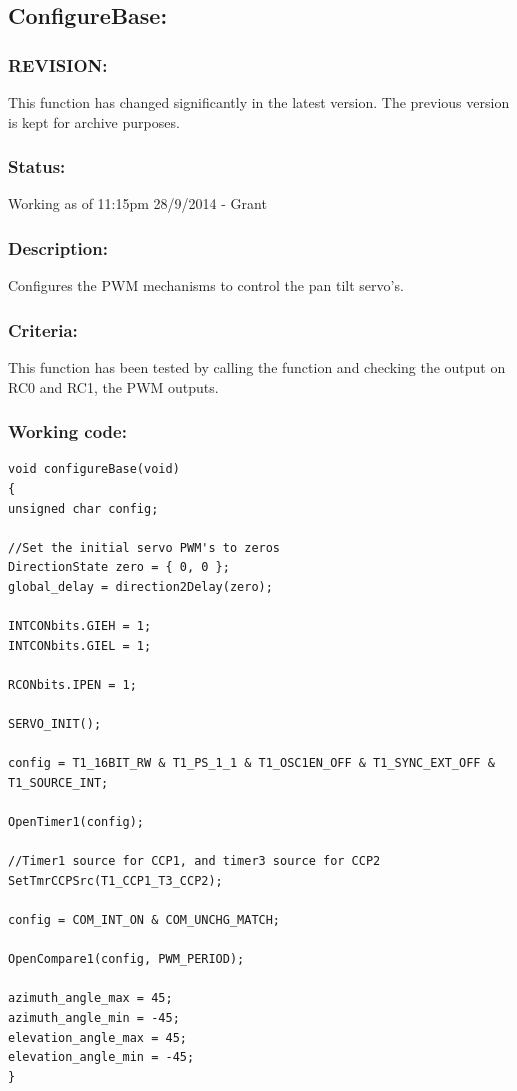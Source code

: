 \documentclass[]{report}
\begin{document}
\subsection{ConfigureBase:}
\subsubsection{REVISION:}
This function has changed significantly in the latest version. The previous version is kept for archive purposes.

\subsubsection{Status:}
Working as of 11:15pm 28/9/2014 - Grant

\subsubsection{Description:}
Configures the PWM mechanisms to control the pan tilt servo's.

\subsubsection{Criteria:}
This function has been tested by calling the function and checking the output on RC0 and RC1, the PWM outputs.

\subsubsection{Working code:}
\begin{lstlisting}
void configureBase(void)
{
unsigned char config;

//Set the initial servo PWM's to zeros
DirectionState zero = { 0, 0 };
global_delay = direction2Delay(zero);

INTCONbits.GIEH = 1;
INTCONbits.GIEL = 1;

RCONbits.IPEN = 1;

SERVO_INIT();

config = T1_16BIT_RW & T1_PS_1_1 & T1_OSC1EN_OFF & T1_SYNC_EXT_OFF & T1_SOURCE_INT;

OpenTimer1(config);

//Timer1 source for CCP1, and timer3 source for CCP2
SetTmrCCPSrc(T1_CCP1_T3_CCP2);

config = COM_INT_ON & COM_UNCHG_MATCH;

OpenCompare1(config, PWM_PERIOD);

azimuth_angle_max = 45;
azimuth_angle_min = -45;
elevation_angle_max = 45;
elevation_angle_min = -45;
}
\end{lstlisting}
\end{document}
